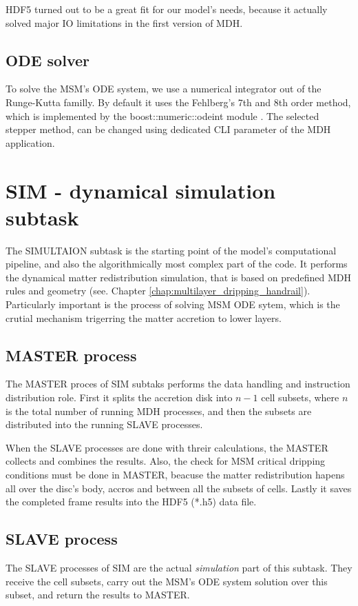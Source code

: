     HDF5 turned out to be a great fit for our model's needs, because it actually solved major IO limitations in the first version of MDH.

\subsection{ODE solver}
    To solve the MSM's ODE system, we use a numerical integrator out of the Runge-Kutta familly. By default it uses the Fehlberg's 7th and 8th order method, which is implemented by the boost::numeric::odeint module \citep{boost_2007}. The selected stepper method, can be changed using dedicated CLI parameter of the MDH application. 

\section{SIM - dynamical simulation subtask}
    The SIMULTAION subtask is the starting point of the model's computational pipeline, and also the algorithmically most complex part of the code. It performs the dynamical matter redistribution simulation, that is based on predefined MDH rules and geometry (see. Chapter \ref{chap:multilayer_dripping_handrail}). Particularly important is the process of solving MSM ODE sytem, which is the crutial mechanism trigerring the matter accretion to lower layers. 

\subsection{MASTER process}
    The MASTER proces of SIM subtaks performs the data handling and instruction distribution role. First it splits the accretion disk into $n-1$ cell subsets, where $n$ is the total number of running MDH processes, and then the subsets are distributed into the running SLAVE processes.

    When the SLAVE processes are done with threir calculations, the MASTER collects and combines the results. Also, the check for MSM critical dripping conditions must be done in MASTER, beacuse the matter redistribution hapens all over the disc's body, accros and between all the subsets of cells. Lastly it saves the completed frame results into the HDF5 (*.h5) data file. 

\subsection{SLAVE process}
    The SLAVE processes of SIM are the actual \emph{simulation} part of this subtask. They receive the cell subsets, carry out the MSM's ODE system solution over this subset, and return the results to MASTER. 

